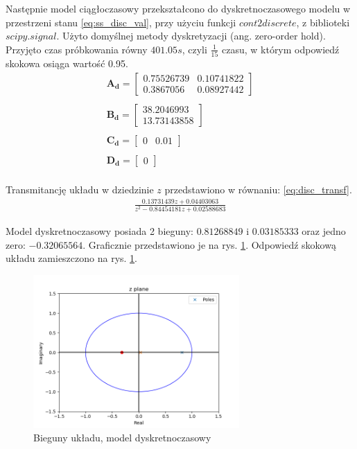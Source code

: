 \documentclass{article}
\begin{document}
Następnie model ciągłoczasowy przekształcono do dyskretnoczasowego modelu w przestrzeni stanu \ref{eq:ss_disc_val}, przy użyciu funkcji $cont2discrete$, z biblioteki $scipy.signal$. Użyto domyślnej metody dyskretyzacji (ang. zero-order hold). Przyjęto czas próbkowania równy $401.05s$, czyli $\frac{1}{15}$ czasu, w którym odpowiedź skokowa osiąga wartość 0.95.
\begin{equation}\label{eq:ss_disc_val}
 \begin{array}{l}
  \mathbf{A_d} = \begin{bmatrix}  0.75526739 & 0.10741822 \\
  							     0.3867056  & 0.08927442 
  			   \end{bmatrix} \\ \\
  \mathbf{B_d} = \begin{bmatrix} 38.2046993 \\ 13.73143858 \end{bmatrix} \\ \\
  \mathbf{C_d} = \begin{bmatrix} 0 & 0.01 \end{bmatrix} \\ \\
  \mathbf{D_d} = \begin{bmatrix} 0 \end{bmatrix} \\
\end{array}
\end{equation}

Transmitancję układu w dziedzinie $z$ przedstawiono w równaniu: \ref{eq:disc_transf}.
\begin{equation}\label{eq:disc_transf}
 \begin{array}{l}
  \frac{0.13731439 z + 0.04403063}{ z^2 - 0.84454181 z + 0.02588683}
\end{array}
\end{equation}

Model dyskretnoczasowy posiada 2 bieguny: $0.81268849$ i $0.03185333$ oraz jedno zero: $-0.32065564$. Graficznie przedstawiono je na rys. \ref{fig:disc_poles}. Odpowiedź skokową układu zamieszczono na rys. \ref{fig:disc_poles}.

\begin{figure}[H]
    \centering
    \includegraphics[width=0.7\textwidth]{img/disc_poles.png}
    \caption{Bieguny układu, model dyskretnoczasowy}
    \label{fig:disc_poles}
\end{figure}
\end{document}
